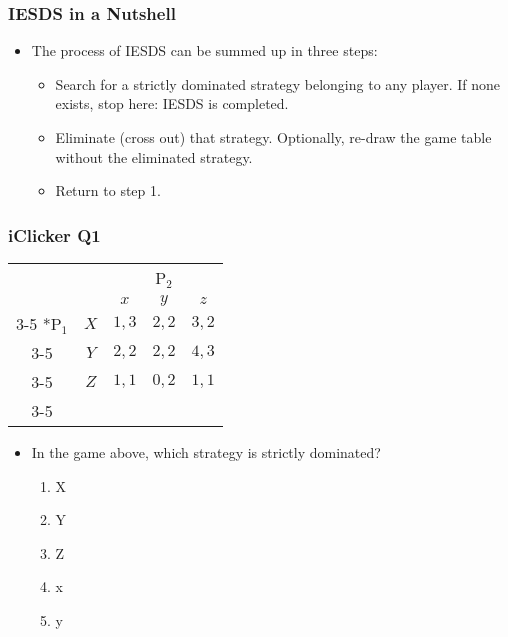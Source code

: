 \begin{frame}
\frametitle{IESDS in a Nutshell}
\begin{itemize}
	\item The process of IESDS can be summed up in three steps:
	\begin{itemize}
		\item[1.] Search for a strictly dominated strategy belonging to any player. If none exists, stop here: IESDS is completed.
		\item[2.] Eliminate (cross out) that strategy. Optionally, re-draw the game table without the eliminated strategy.
		\item[3.] Return to step 1.
	\end{itemize}
\end{itemize}
\end{frame}

\begin{frame}
\frametitle{iClicker Q1}
\begin{table}[h]
	\centering
	\setlength{\extrarowheight}{2pt}
	\begin{tabular}{cc|c|c|c|}
		& \multicolumn{1}{c}{} & \multicolumn{3}{c}{P$_2$}\\
		& \multicolumn{1}{c}{} & \multicolumn{1}{c}{$x$} & \multicolumn{1}{c}{$y$} & \multicolumn{1}{c}{$z$} \\\cline{3-5}
		\multirow{3}*{P$_1$}  & $X$ & $1,3$ & $2,2$ & $3,2$ \\\cline{3-5}
		& $Y$ & $2,2$ & $2,2$ & $4,3$\\\cline{3-5}
		& $Z$ & $1,1$ & $0,2$ & $1,1$\\\cline{3-5}
	\end{tabular}
\end{table}
\begin{itemize}
	\item In the game above, which strategy is strictly dominated?
	\begin{enumerate}[label=\Alph*)]
		\item X
		\item Y
		\item Z
		\item x
		\item y
	\end{enumerate}
\end{itemize}
\end{frame}

